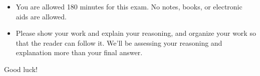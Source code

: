 \bigskip

\begin{itemize}
\item You are allowed 180 minutes for this exam.  No notes,
  books, or electronic aids are allowed.

\item Please show your work and explain your reasoning, and organize
  your work so that the reader can follow it.  We'll be assessing your
  reasoning and explanation more than your final answer.

\end{itemize}

Good luck!
